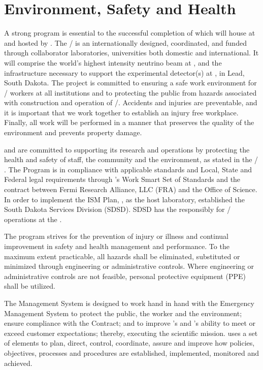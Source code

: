 \chapter{Environment, Safety and Health}
\label{vl:tc-ESH}


A strong  program is essential to the successful completion
of  which will house  at \surf and hosted by
\fnal.  The / is an internationally designed,
coordinated, and funded through collaborator laboratories,
universities both domestic and international.  It will comprise the
world's highest intensity neutrino beam at \fnal, and the
infrastructure necessary to support the experimental detector(s) at
\surf, in Lead, South Dakota.  The project is committed to ensuring a
safe work environment for / workers at all
institutions and to protecting the public from hazards associated with
construction and operation of /.  Accidents and
injuries are preventable, and it is important that we work together to
establish an injury free workplace.  Finally, all work will be
performed in a manner that preserves the quality of the environment
and prevents property damage.

\fnal and  are committed to supporting its research and
operations by protecting the health and safety of staff, the community
and the environment, as stated in the /
. The  Program
is in compliance with applicable standards and Local, State and
Federal legal requirements through \fnal's Work Smart Set of Standards
and the contract between Fermi Research Alliance, LLC (FRA) and the
 Office of Science.  In order to implement the
ISM Plan, \fnal, as the host laboratory, established the South Dakota
Services Division (SDSD).  SDSD has the responsibly for
/ operations at the \surf.

The program strives for the prevention of injury or illness and
continual improvement in safety and health management and performance.
To the maximum extent practicable, all hazards shall be eliminated,
substituted or minimized through engineering or administrative
controls.  Where engineering or administrative controls are not
feasible, personal protective equipment (PPE) shall be utilized.

The  Management System is
designed to work hand in hand with the Emergency Management System to
protect the public, the worker and the environment; ensure compliance
with the Contract; and to improve \fnal's and 's ability to
meet or exceed customer expectations; thereby, executing the
scientific mission.  \fnal uses a set of elements to plan, direct,
control, coordinate, assure and improve how  policies, objectives,
processes and procedures are established, implemented, monitored and
achieved.


